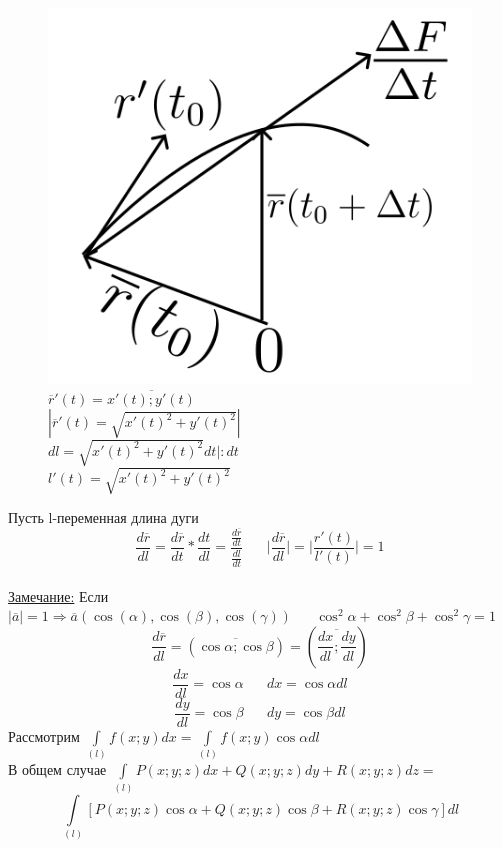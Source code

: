 \documentclass[12pt]{article}
\let\ORIincludegraphics\includegraphics
\renewcommand{\includegraphics}[2][]{\ORIincludegraphics[scale=0.65,#1]{#2}}
\let\oldint\int
\renewcommand{\int}{\oldint\limits}
\begin{document}
\begin{figure}[h!]
\begin{minipage}{0.45\textwidth}
        \centering
        \includegraphics[width=\textwidth]{8.6.2.png} %
        \vspace{0.5em} %
        $\overline{r}'(t)=\overline{x'(t);y'(t)}$\\
        $|\overline{r}'(t)=\sqrt{x'(t)^2+y'(t)^2}|$\\
        $dl=\sqrt{x'(t)^2+y'(t)^2}dt|:dt$\\
        $l'(t)=\sqrt{x'(t)^2+y'(t)^2}$
    \end{minipage}
  \end{figure}
  \par
  Пусть l-переменная длина дуги\\
  \[\frac{d \overline{r}}{dl} = \frac{d \overline{r}}{dt}* \frac{dt}{dl}=\frac{\frac{d \overline{r}}{dt}}{\frac{dl}{dt}}
  \hspace{20pt} \Big| \frac{d \overline{r}}{dl} \Big| = \Big| \frac{r'(t)}{l'(t)} \Big| = 1\]\\
  \underline{Замечание:} Если $|\overline{a}|=1 \Rightarrow \overline{a}(\cos(\alpha),\cos(\beta),\cos(\gamma))
  \hspace{20pt} \cos^2 \alpha+\cos^2 \beta+\cos^2 \gamma=1$\\
  \[\frac{d \overline{r}}{dl}=(\overline{\cos \alpha; \cos \beta})=(\overline{\frac{dx}{dl};\frac{dy}{dl}})\]
  \[\frac{dx}{dl}=\cos \alpha \hspace{20pt} dx=\cos \alpha dl\]
  \[\frac{dy}{dl}=\cos \beta \hspace{20pt} dy=\cos \beta dl\]
  Рассмотрим $\int_{(l)}f(x;y)dx=\int_{(l)}f(x;y)\cos \alpha dl$\\
  В общем случае $\int_{(l)}P(x;y;z)dx+Q(x;y;z)dy+R(x;y;z)dz=$\\
  \[\int_{(l)} [P(x;y;z)\cos \alpha + Q(x;y;z)\cos \beta + R(x;y;z)\cos \gamma]dl\]
\end{document}
